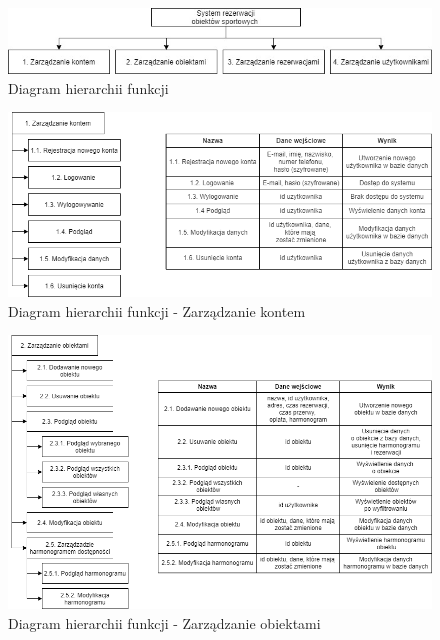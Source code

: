\documentclass[a4paper,11pt]{article}
\begin{document}
    \begin{figure}[H] 
    	\begin{center}
    		\includegraphics[width=1\textwidth]{img2/HFD.jpg}
            \caption{Diagram hierarchii funkcji}
    	\end{center}
    \end{figure}
    
    \begin{figure}[H] 
    	\begin{center}
    		\includegraphics[width=1\textwidth]{img2/HFD-1.png}
            \caption{Diagram hierarchii funkcji - Zarządzanie kontem}
    	\end{center}
    \end{figure}
    
    \begin{figure}[H] 
    	\begin{center}
    		\includegraphics[width=1\textwidth]{img2/HFD-2.png}
            \caption{Diagram hierarchii funkcji - Zarządzanie obiektami}
    	\end{center}
    \end{figure}
    
\end{document}
